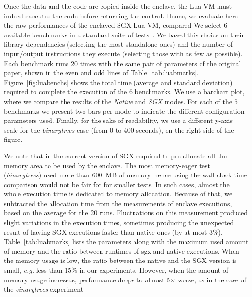 Once the data and the code are copied inside the enclave, the Lua VM must indeed executes the code before returning the control. 
Hence, we evaluate here the raw performances of the enclaved SGX Lua VM, compared 
We select 6 available benchmarks in a standard suite of tests~\cite{bolz2015}.
We based this choice on their library dependencies (selecting the most standalone ones) and the number of input/output instructions they execute (selecting those with as few as possible).
Each benchmark runs 20 times with the same pair of parameters of the original paper, shown in the even and odd lines of Table~\ref{tab:luabmarks}.
Figure~\ref{fig:luabenchs} shows the total time (average and standard deviation) required to complete the execution of the 6 benchmarks.
We use a barchart plot, where we compare the results of the \emph{Native} and \emph{SGX} modes. 
For each of the 6 benchmarks we present two bars per mode to indicate the different configuration parameters used.
Finally, for the sake of readability, we use a different y-axis scale for the \emph{binarytrees} case (from 0 to 400 seconds), on the right-side of the figure.

We note that in the current version of SGX required to pre-allocate all the memory area to be used by the enclave. 
The most memory-eager test (\emph{binarytrees}) used more than 600~MB of memory, hence using the wall clock time comparison would not be fair for for smaller tests.
In such cases, almost the whole execution time is dedicated to memory allocation.
Because of that, we subtracted the allocation time from the measurements of enclave executions, based on the average for the 20 runs.
Fluctuations on this measurement produced slight variations in the execution times, sometimes producing the unexpected result of having SGX executions faster than native ones (by at most 3\%).
Table~\ref{tab:luabmarks} lists the parameters along with the maximum used amount of memory and the ratio between runtimes of sgx and native executions.
When the memory usage is low, the ratio between the native and the SGX version is small, \emph{e.g.} less than 15\% in our experiments. 
However, when the amount of memory usage increseas, performance drops to almost 5$\times$  worse, as in the case of the \emph{binarytrees} experiment.

